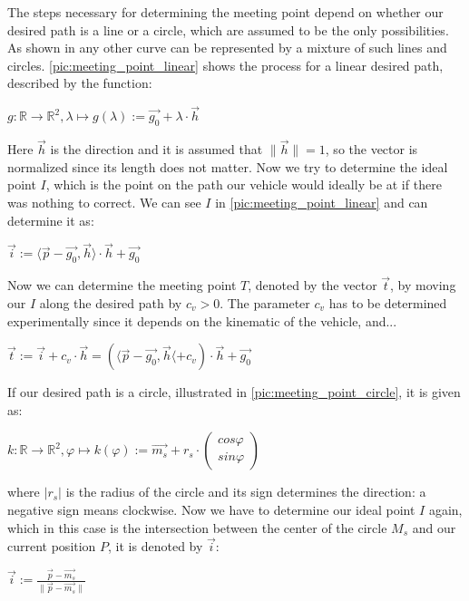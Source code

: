 The steps necessary for determining the meeting point depend on whether our desired path is a line or a circle, which are assumed to be the only possibilities. As shown in \cite{12} any other curve can be represented by a mixture of such lines and circles.
\ref{pic:meeting_point_linear} shows the process for a linear desired path, described by the function:
\begin{center}
$g:\mathbb{R} \to \mathbb{R}^2 , \lambda \mapsto g(\lambda ) := \vec{g_0} + \lambda \cdot \vec{h}$
\end{center}
Here $\vec{h}$ is the direction and it is assumed that $\|\vec{h}\|=1$, so the vector is normalized since its length does not matter. Now we try to determine the ideal point $I$, which is the point on the path our vehicle would ideally be at if there was nothing to correct. We can see $I$ in \ref{pic:meeting_point_linear} and can determine it as:
\begin{center}
$\vec{i}:= \langle \vec{p}-\vec{g_0}, \vec{h} \rangle \cdot \vec{h} + \vec{g_0}$
\end{center}
Now we can determine the meeting point $T$, denoted by the vector $\vec{t}$, by moving our $I$ along the desired path by $c_v>0$. The parameter $c_v$ has to be determined experimentally since it depends on the kinematic of the vehicle, and...
\begin{center}
$\vec{t}:=\vec{i}+c_v \cdot \vec{h} = ( \langle \vec{p} - \vec{g_0}, \vec{h} \langle + c_v) \cdot \vec{h} + \vec{g_0}$
\end{center}

If our desired path is a circle, illustrated in \ref{pic:meeting_point_circle}, it is given as:

\begin{center}
$k: \mathbb{R} \to \mathbb{R}^2, \varphi \mapsto k(\varphi ) := \vec{m_s}+r_s \cdot \left( \begin{array}{c} cos\varphi \\ sin \varphi \end{array} \! \right)$
\end{center}

where $|r_s|$ is the radius of the circle and its sign determines the direction: a negative sign means clockwise. Now we have to determine our ideal point $I$ again, which in this case is the intersection between the center of the circle $M_s$ and our current position $P$, it is denoted by $\vec{i}$:

\begin{center}
$\vec{i}:=\frac{\vec{p}-\vec{m_s}}{\| \vec{p}-\vec{m_s}\|}$
\end{center}

